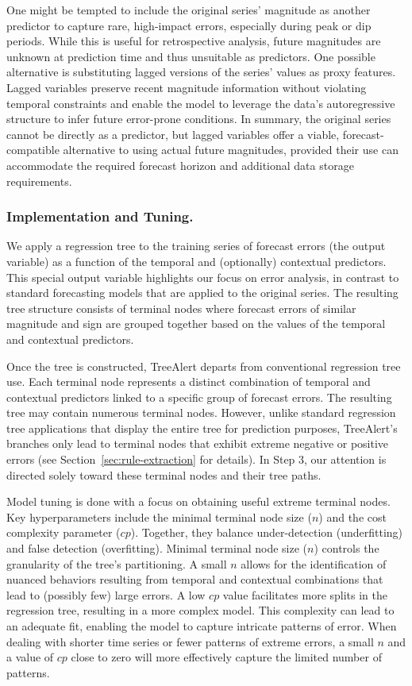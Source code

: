 \documentclass[ijds,sglanonrev]{informs4}
\begin{document}
One might be tempted to include the original series’ magnitude as another predictor to capture rare, high-impact errors, especially during peak or dip periods. While this is useful for retrospective analysis, future magnitudes are unknown at prediction time and thus unsuitable as predictors. One possible alternative is substituting lagged versions of the series’ values as proxy features. Lagged variables preserve recent magnitude information without violating temporal constraints and enable the model to leverage the data’s autoregressive structure to infer future error-prone conditions. In summary, the original series cannot be directly as a predictor, but lagged variables offer a viable, forecast-compatible alternative to using actual future magnitudes, provided their use can accommodate the required forecast horizon and additional data storage requirements.

\subsubsection{Implementation and Tuning.}
We apply a regression tree to the training series of forecast errors (the output variable) as a function of the temporal and (optionally) contextual predictors. This special output variable highlights our focus on error analysis, in contrast to standard forecasting models that are applied to the original series. The resulting tree structure consists of terminal nodes where forecast errors of similar magnitude and sign are grouped together based on the values of the temporal and contextual predictors. 

Once the tree is constructed, TreeAlert departs from conventional regression tree use. Each terminal node represents a distinct combination of temporal and contextual predictors linked to a specific group of forecast errors. The resulting tree may contain numerous terminal nodes. However, unlike standard regression tree applications that display the entire tree for prediction purposes, TreeAlert’s branches only lead to terminal nodes that exhibit extreme negative or positive errors (see Section~\ref{sec:rule-extraction} for details). In Step 3, our attention is directed solely toward these terminal nodes and their tree paths.

Model tuning is done with a focus on obtaining useful extreme terminal nodes. Key hyperparameters include the minimal terminal node size ($n$) and the cost complexity parameter ($cp$). Together, they balance under-detection (underfitting) and false detection (overfitting). Minimal terminal node size ($n$) controls the granularity of the tree’s partitioning. A small $n$ allows for the identification of nuanced behaviors resulting from temporal and contextual combinations that lead to (possibly few) large errors. A low $cp$ value facilitates more splits in the regression tree, resulting in a more complex model. This complexity can lead to an adequate fit, enabling the model to capture intricate patterns of error. When dealing with shorter time series or fewer patterns of extreme errors, a small $n$ and a value of $cp$ close to zero will more effectively capture the limited number of patterns.
\end{document}
